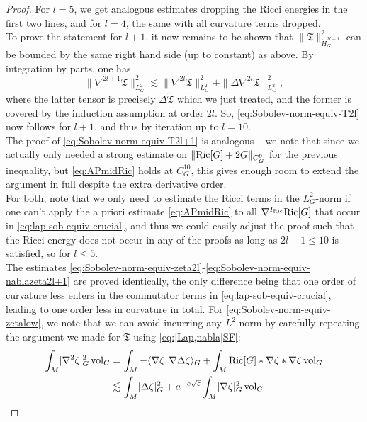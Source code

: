 \documentclass[11pt,leqno,textwidth=10cm]{amsart}
\numberwithin{equation}{section}
\theoremstyle{definition}
\theoremstyle{plain}
\newcommand{\1}{\mathbbm{1}}
\newcommand{\Ric}{\text{\normalfont{Ric}}}
\newcommand{\vol}[1]{{\text{\normalfont{vol}}}_{#1}}
\renewcommand{\epsilon}{\varepsilon}
\newcommand{\Lap}{\Delta}
\newcommand{\change}[1]{\color{black}#1\color{black}}
\begin{document}
\begin{proof}
\change{For $l=5$, we get analogous estimates dropping the Ricci energies in the first two lines, and for $l=4$, the same with all curvature terms dropped.\\}
To prove the statement for $l+1$, it now remains to be shown that $\|\mathfrak{T}\|_{\dot{H}^{2l+1}_G}^2$ can be bounded by the same right hand side (up to constant) as above. By integration by parts, one has
\[\|\nabla^{2l+1}\mathfrak{T}\|_{L^2_G}^2\lesssim \|\nabla^{2l}\mathfrak{T}\|_{L^2_G}^2+\|\Lap\nabla^{2l}\mathfrak{T}\|_{L^2_G}^2,\]
where the latter tensor is precisely $\Lap\tilde{\mathfrak{T}}$ which we just treated, and the former is covered by the induction assumption at order $2l$. So, \eqref{eq:Sobolev-norm-equiv-T2l} now follows for $l+1$, and thus by iteration up to $l=10$.\\

\noindent The proof of \eqref{eq:Sobolev-norm-equiv-T2l+1} is analogous -- we note that since we actually only needed a strong estimate on $\|\Ric[G]+2G\|_{C^9_G}$ for the previous inequality, but \eqref{eq:APmidRic} holds at $C^{10}_G$, this gives enough room to extend the argument in full despite the extra derivative order.\\
For both, note that we only need to estimate the Ricci terms in the $L^2_G$-norm if one can't apply the a priori estimate \eqref{eq:APmidRic} to all $\nabla^{I_\Ric}\Ric[G]$ that occur in \eqref{eq:lap-sob-equiv-crucial}, and thus we could easily adjust the proof such that the Ricci energy does not occur in any of the proofs as long as $2l-1\leq 10$ is satisfied, so for $l\leq 5$.\\

The estimates \eqref{eq:Sobolev-norm-equiv-zeta2l}-\eqref{eq:Sobolev-norm-equiv-nablazeta2l+1} are proved identically, the only difference being that one order of curvature less enters in the commutator terms in \eqref{eq:lap-sob-equiv-crucial}, leading to one order less in curvature in total. For \eqref{eq:Sobolev-norm-equiv-zetalow}, we note that we can avoid incurring any $L^2$-norm by carefully repeating the argument we made for $\tilde{\mathfrak{T}}$ using \eqref{eq:[Lap,nabla]SF}:
\begin{align*}
\int_M\lvert\nabla^2\zeta\rvert_G^2\,\vol{G}%
=&\,\int_M-\langle\nabla\zeta,\nabla\Lap\zeta\rangle_G+\int_M\Ric[G]\ast\nabla\zeta\ast\nabla\zeta\,\vol{G}\\
\lesssim&\,\int_M\lvert\Lap\zeta\rvert_G^2+a^{-c\sqrt{\epsilon}}\int_M\lvert\nabla\zeta\rvert_G^2\,\vol{G}
\end{align*}
\end{proof}
\end{document}
